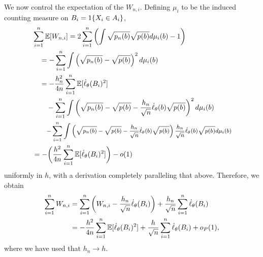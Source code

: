 We now control the expectation of the $W_{n,i}$. Defining $\mu_i$ to be the
induced counting measure on $B_i = 1\!\left\{X_i \in A_i\right\}$,
\begin{align*}
  & \sum_{i = 1}^n \E[W_{n,i}]
  = 2\sum_{i = 1}^n
  \left(\int \sqrt{p_n(b)} \sqrt{p(b)} d\mu_i(b) - 1 \right) \\
  & \quad = -\sum_{i = 1}^n \int \left(\sqrt{p_n(b)} - \sqrt{p(b)}\right)^2
  d\mu_i(b) \\
  & \quad = -\frac{h_n^2}{4 n} \sum_{i = 1}^n \E[\score_\theta(B_i)^2] \\
  & \qquad 
  - \sum_{i = 1}^n \int \left(\sqrt{p_n(b)} - \sqrt{p(b)}
  - \frac{h_n}{\sqrt{n}} \score_\theta(b) \sqrt{p(b)}\right)^2 d\mu_i(b) \\
  & \qquad \medmath{
  - \sum_{i = 1}^n \int \left(\sqrt{p_n(b)} - \sqrt{p(b)}
  - \frac{h_n}{\sqrt{n}} \score_\theta(b) \sqrt{p(b)}\right)
  \frac{h_n}{\sqrt{n}} \score_\theta(b) \sqrt{p(b)}d\mu_i(b)} \\
  & = -\bigg(\frac{h^2}{4n} \sum_{i = 1}^n \E[\score_\theta(B_i)^2]\bigg)
  - o(1)
\end{align*}
uniformly in $h$, with a derivation completely paralleling that above.
Therefore, we obtain
\begin{align*}
   \sum_{i = 1}^n W_{n,i} & = \sum_{i = 1}^n \left(W_{n,i} - \frac{h_n}{\sqrt{n}} \dot{\ell}_\theta(B_i)\right)
  + \frac{h_n}{\sqrt{n}} \sum_{i = 1}^n \dot{\ell}_\theta(B_i) \\
  & = -\frac{h^2}{4n} \sum_{i = 1}^n \mathbb{E}[\dot{\ell}_\theta(B_i)^2]
  + \frac{h}{\sqrt{n}} \sum_{i = 1}^n \dot{\ell}_\theta(B_i)
  + o_P(1),
\end{align*}
where we have used that $h_n \to h$.

